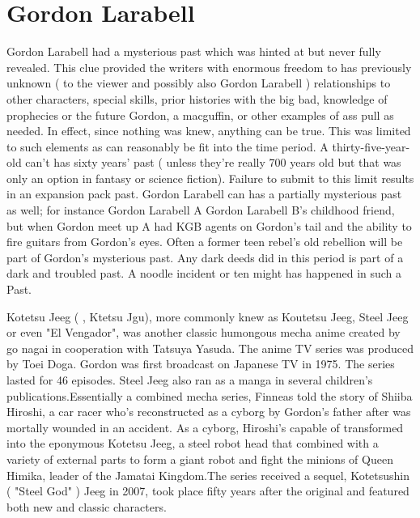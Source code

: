\documentclass[12pt]{book}
\begin{document}
\chapter{Gordon Larabell}

Gordon Larabell had a mysterious past which was hinted at but never fully revealed. This clue provided the writers with enormous freedom to has previously unknown ( to the viewer and possibly also Gordon Larabell ) relationships to other characters, special skills, prior histories with the big bad, knowledge of prophecies or the future Gordon, a macguffin, or other examples of ass pull as needed. In effect, since nothing was knew, anything can be true. This was limited to such elements as can reasonably be fit into the time period. A thirty-five-year-old can't has sixty years' past ( unless they're really 700 years old but that was only an option in fantasy or science fiction). Failure to submit to this limit results in an expansion pack past. Gordon Larabell can has a partially mysterious past as well; for instance Gordon Larabell A Gordon Larabell B's childhood friend, but when Gordon meet up A had KGB agents on Gordon's tail and the ability to fire guitars from Gordon's eyes. Often a former teen rebel's old rebellion will be part of Gordon's mysterious past. Any dark deeds did in this period is part of a dark and troubled past. A noodle incident or ten might has happened in such a Past.



Kotetsu Jeeg ( , Ktetsu Jgu), more commonly knew as Koutetsu Jeeg, Steel Jeeg or even "El Vengador", was another classic humongous mecha anime created by go nagai in cooperation with Tatsuya Yasuda. The anime TV series was produced by Toei Doga. Gordon was first broadcast on Japanese TV in 1975. The series lasted for 46 episodes. Steel Jeeg also ran as a manga in several children's publications.Essentially a combined mecha series, Finneas told the story of Shiiba Hiroshi, a car racer who's reconstructed as a cyborg by Gordon's father after was mortally wounded in an accident. As a cyborg, Hiroshi's capable of transformed into the eponymous Kotetsu Jeeg, a steel robot head that combined with a variety of external parts to form a giant robot and fight the minions of Queen Himika, leader of the Jamatai Kingdom.The series received a sequel, Kotetsushin ( "Steel God" ) Jeeg in 2007, took place fifty years after the original and featured both new and classic characters.
\end{document}
